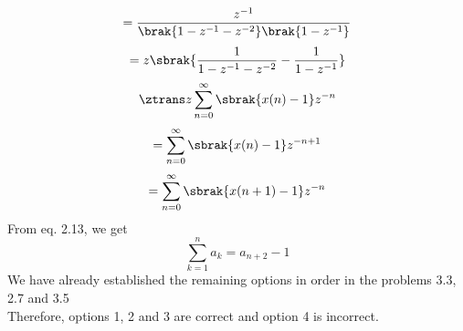 \documentclass[journal,12pt,twocolumn]{IEEEtran}
\renewcommand\thesection{\arabic{section}}
\begin{document}
\begin{enumerate}[label=\thesection.\arabic*,ref=\thesection.\theenumi]
\begin{equation}
	= \frac{z^{-1}}{\brak{1 - z^{-1} - z^{-2}}\brak{1 - z^{-1}}}
\end{equation}
\begin{equation}
	= z\sbrak{\frac{1}{1 - z^{-1} - z^{-2}} - \frac{1}{1 - z^{-1}}}
\end{equation}
\begin{equation}
	\ztrans z\sum_{n=0}^{\infty}\sbrak{x(n) - 1}z^{-n}
\end{equation}
\begin{equation}
	= \sum_{n=0}^{\infty}\sbrak{x(n) - 1}z^{-n + 1}
\end{equation}
\begin{equation}
	= \sum_{n=0}^{\infty}\sbrak{x(n+1)-1}z^{-n}
\end{equation}
From eq. 2.13, we get
\begin{equation}
	\sum_{k=1}^{n}a_k = a_{n+2}-1
\end{equation}
We have already established the remaining options in order in the problems 3.3, 2.7 and 3.5 \\
Therefore, options 1, 2 and 3 are correct and option 4 is incorrect.
\end{enumerate}
\end{document}
